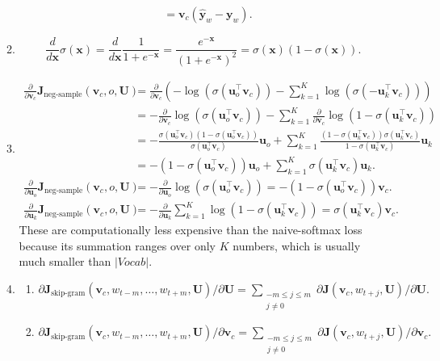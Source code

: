 \documentclass[12pt, dvipdfmx]{article}
\begin{document}
\begin{enumerate}[label=\textbf{\arabic*}]
\begin{enumerate}[label=(\alph*)]
\begin{align*}
      &=\bm{v}_c(\bm{\hat{y}}_w-\bm{y}_w).
    \end{align*}
    \item \[\frac{d}{d\bm{x}}\sigma(\bm{x})=\frac{d}{d\bm{x}}\frac{1}{1+e^{-\bm{x}}}=\frac{e^{-\bm{x}}}{(1+e^{-\bm{x}})^2}=\sigma(\bm{x})(1-\sigma(\bm{x})).\]
    \item
    \begin{align*}
      \frac{\partial}{\partial\bm{v}_c}\bm{J}_{\textrm{neg-sample}}(\bm{v}_c,o,\bm{U}) &=\frac{\partial}{\partial\bm{v}_c}\left(-\log(\sigma(\bm{u}_o^\top\bm{v}_c))-\sum_{k=1}^K\log(\sigma(-\bm{u}_k^\top\bm{v}_c))\right) \\
      &=-\frac{\partial}{\partial\bm{v}_c}\log(\sigma(\bm{u}_o^\top\bm{v}_c))-\sum_{k=1}^K\frac{\partial}{\partial\bm{v}_c}\log(1-\sigma(\bm{u}_k^\top\bm{v}_c)) \\
      &=-\frac{\sigma(\bm{u}_o^\top\bm{v}_c)(1-\sigma(\bm{u}_o^\top\bm{v}_c))}{\sigma(\bm{u}_o^\top\bm{v}_c)}\bm{u}_o+\sum_{k=1}^K\frac{(1-\sigma(\bm{u}_k^\top\bm{v}_c))\sigma(\bm{u}_k^\top\bm{v}_c)}{1-\sigma(\bm{u}_k^\top\bm{v}_c)}\bm{u}_k \\
      &=-(1-\sigma(\bm{u}_o^\top\bm{v}_c))\bm{u}_o+\sum_{k=1}^K\sigma(\bm{u}_k^\top\bm{v}_c)\bm{u}_k. \\
      \frac{\partial}{\partial\bm{u}_o}\bm{J}_{\textrm{neg-sample}}(\bm{v}_c,o,\bm{U}) &=-\frac{\partial}{\partial\bm{u}_o}\log(\sigma(\bm{u}_o^\top\bm{v}_c))=-(1-\sigma(\bm{u}_o^\top\bm{v}_c))\bm{v}_c.\\
      \frac{\partial}{\partial\bm{u}_k}\bm{J}_{\textrm{neg-sample}}(\bm{v}_c,o,\bm{U}) &=-\frac{\partial}{\partial\bm{u}_k}\sum_{k=1}^K\log(1-\sigma(\bm{u}_k^\top\bm{v}_c))=\sigma(\bm{u}_k^\top\bm{v}_c)\bm{v}_c.
    \end{align*}
    These are computationally less expensive than the naive-softmax loss because its summation ranges over only $K$ numbers, which is usually much smaller than $|Vocab|$.
    \item
    \begin{enumerate}[label=(\roman*)]
      \item $\partial\bm{J}_{\textrm{skip-gram}}(\bm{v}_c,w_{t-m},\ldots,w_{t+m},\bm{U})/\partial\bm{U}=\sum\limits_{\substack{-m\leq j\leq m\\j\neq 0}}\partial\bm{J}(\bm{v}_c,w_{t+j},\bm{U})/\partial\bm{U}.$
      \item $\partial\bm{J}_{\textrm{skip-gram}}(\bm{v}_c,w_{t-m},\ldots,w_{t+m},\bm{U})/\partial\bm{v}_c=\sum\limits_{\substack{-m\leq j\leq m\\j\neq 0}}\partial\bm{J}(\bm{v}_c,w_{t+j},\bm{U})/\partial\bm{v}_c.$

\end{enumerate}
\end{enumerate}
\end{enumerate}
\end{document}

